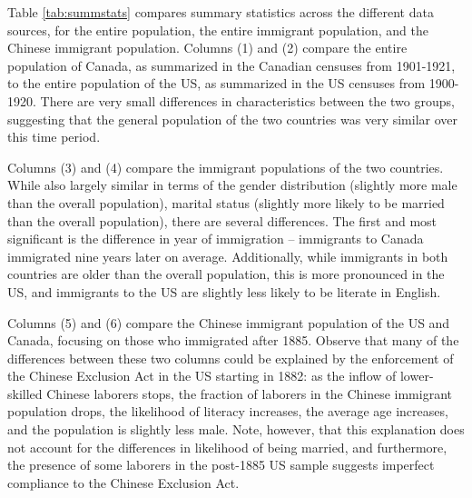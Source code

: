 \documentclass[12pt]{article}
\begin{document}
Table \ref{tab:summstats} compares summary statistics across the different data sources, for the entire population, the entire immigrant population, and the Chinese immigrant population. Columns (1) and (2) compare the entire population of Canada, as summarized in the Canadian censuses from 1901-1921, to the entire population of the US, as summarized in the US censuses from 1900-1920. There are very small differences in characteristics between the two groups, suggesting that the general population of the two countries was very similar over this time period. 

Columns (3) and (4) compare the immigrant populations of the two countries. While also largely similar in terms of the gender distribution (slightly more male than the overall population), marital status (slightly more likely to be married than the overall population), there are several differences. The first and most significant is the difference in year of immigration -- immigrants to Canada immigrated nine years later on average. Additionally, while immigrants in both countries are older than the overall population, this is more pronounced in the US, and immigrants to the US are slightly less likely to be literate in English. 

Columns (5) and (6) compare the Chinese immigrant population of the US and Canada, focusing on those who immigrated after 1885. Observe that many of the differences between these two columns could be explained by the enforcement of the Chinese Exclusion Act in the US starting in 1882: as the inflow of lower-skilled Chinese laborers stops, the fraction of laborers in the Chinese immigrant population drops, the likelihood of literacy increases, the average age increases, and the population is slightly less male. Note, however, that this explanation does not account for the differences in likelihood of being married, and furthermore, the presence of some laborers in the post-1885 US sample suggests imperfect compliance to the Chinese Exclusion Act. 
\end{document}
